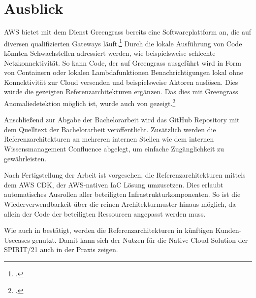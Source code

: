 \section{Ausblick}\label{section:Ausblic}
\ac{AWS} bietet mit dem Dienst Greengrass bereits eine Softwareplattform an, die auf diversen qualifizierten Gateways läuft.\footcite[Vgl. auch im Folgenden][]{AmazonWebServicesInc..o.J.bu} Durch die lokale Ausführung von Code könnten Schwachstellen adressiert werden, wie beispielsweise schlechte Netzkonnektivität. So kann Code, der auf Greengrass ausgeführt wird in Form von Containern oder lokalen Lambdafunktionen Benachrichtigungen lokal ohne Konnektivität zur Cloud versenden und beispielsweise Aktoren auslösen. Dies würde die gezeigten Referenzarchitekturen ergänzen. Das dies mit Greengrass Anomaliedetektion möglich ist, wurde auch von \citeauthor{Shankar.2020} gezeigt.\footcite[Vgl.][]{Shankar.2020}

Anschließend zur Abgabe der Bachelorarbeit wird das GitHub Repository mit dem Quelltext der Bachelorarbeit veröffentlicht. Zusätzlich werden die Referenzarchitekturen an mehreren internen Stellen wie dem internen Wissensmanagement Confluence abgelegt, um einfache Zugänglichkeit zu gewährleisten.

Nach Fertigstellung der Arbeit ist vorgesehen, die Referenzarchitekturen mittels dem \ac{AWS} \ac{CDK}, der \ac{AWS}-nativen \ac{IaC} Lösung umzusetzen. Dies erlaubt automatisches Ausrollen aller beteiligten Infrastrukturkomponenten. So ist die Wiederverwendbarkeit über die reinen Architekturmuster hinaus möglich, da allein der Code der beteiligten Ressourcen angepasst werden muss.

Wie auch in  bestätigt, werden die Referenzarchitekturen in künftigen Kunden-Usecases genutzt. Damit kann sich der Nutzen für die Native Cloud Solution der SPIRIT/21 auch in der Praxis zeigen.